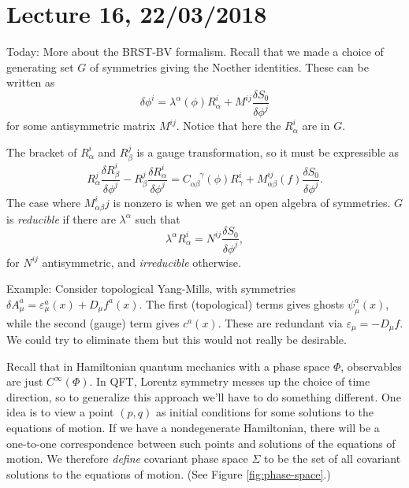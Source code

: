 \section*{Lecture 16, 22/03/2018}
Today: More about the BRST-BV formalism.
Recall that we made a choice of generating set $G$ of symmetries giving the Noether identities.
These can be written as
\[
\delta \phi^i = \lambda^\alpha(\phi) R_\alpha^i + M^{ij} \frac{\delta S_0}{\delta \phi^j}
\]
for some antisymmetric matrix $M^{ij}$.
Notice that here the $R_\alpha^i$ are in $G$.

The bracket of $R_\alpha^i$ and $R_\beta^j$ is a gauge transformation, so it must be expressible as
\[
R_\alpha^j \frac{\delta R_\beta^i}{\delta \phi^j} - R_\beta^j \frac{\delta R_\alpha^i}{\delta \phi^j} = C_{\alpha \beta}^{\phantom{\alpha \beta} \gamma}(\phi) R_\gamma^i + M_{\alpha \beta}^{ij}(f) \frac{\delta S_0}{\delta \phi^j}.
\]
The case where $M_{\alpha \beta}^ij$ is nonzero is when we get an open algebra of symmetries.
$G$ is \emph{reducible} if there are $\lambda^\alpha$ such that
\[
\lambda^\alpha R_\alpha^i = N^{ij} \frac{\delta S_0}{\delta \phi^j},
\]
for $N^{ij}$ antisymmetric, and \emph{irreducible} otherwise.

Example: Consider topological Yang-Mills, with symmetries $\delta A_\mu^a = \varepsilon_\mu^a(x) + D_\mu f^a(x)$.
The first (topological) terms gives ghosts $\psi_\mu^a(x)$, while the second (gauge) term gives $c^a(x)$.
These are redundant via $\varepsilon_\mu = -D_\mu f$.
We could try to eliminate them but this would not really be desirable.

Recall that in Hamiltonian quantum mechanics with a phase space $\Phi$, observables are just $C^\infty(\Phi)$.
In QFT, Lorentz symmetry messes up the choice of time direction, so to generalize this approach we'll have to do something different.
One idea is to view a point $(p,q)$ as initial conditions for some solutions to the equations of motion.
If we have a nondegenerate Hamiltonian, there will be a one-to-one correspondence between such points and solutions of the equations of motion.
We therefore \emph{define} covariant phase space $\Sigma$ to be the set of all covariant solutions to the equations of motion.
(See Figure \ref{fig:phase-space}.)

